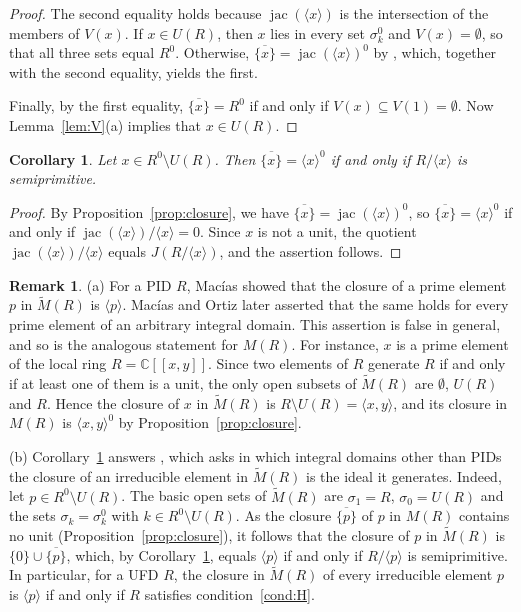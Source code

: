 \documentclass[12pt,reqno,a4paper]{amsart}
\newcommand{\C}{\mathbb{C}}
\newcommand{\clo}[1]{\overline{\{#1\}}}
\newcommand{\pow}[1]{[\![#1]\!]}
\DeclareMathOperator{\jac}{jac}
\theoremstyle{plain}
\newtheorem{corollary}[theorem]{Corollary}
\theoremstyle{definition}
\newtheorem{remark}[theorem]{Remark}
\begin{document}
\begin{proof}
The second equality holds because $\jac(\langle x\rangle)$ is the intersection of the members of $V(x)$. If $x\in U(R)$, then $x$ lies in every set $\sigma_k^0$ and $V(x)=\emptyset$, so that all three sets equal $R^0$. Otherwise, $\clo{x}=\jac(\langle x\rangle)^0$ by \cite[Proposition~3.8]{MaciasOrtiz}, which, together with the second equality, yields the first.

Finally, by the first equality, $\clo{x}=R^0$ if and only if $V(x)\subseteq V(1)=\emptyset$. Now Lemma~\ref{lem:V}(a) implies that $x\in U(R)$.
\end{proof}
\begin{corollary}\label{cor:closureprime}
Let $x\in R^0\setminus U(R)$. Then $\clo{x}=\langle x\rangle^0$ if and only if $R/\langle x\rangle$ is semiprimitive.
\end{corollary}
\begin{proof}
By Proposition~\ref{prop:closure}, we have $\clo{x}=\jac(\langle x\rangle)^0$, so $\clo{x}=\langle x\rangle^0$ if and only if $\jac(\langle x\rangle)/\langle x\rangle=0$. Since $x$ is not a unit, the quotient $\jac(\langle x\rangle)/\langle x\rangle$ equals $J(R/\langle x\rangle)$, and the assertion follows.
\end{proof}
\begin{remark}\label{rem:MO}
(a) For a PID $R$, Mac\'ias \cite[Theorem~3.1]{MaciasDomains} showed that the closure of a prime element $p$ in $\widetilde{M}(R)$ is $\langle p\rangle$. Mac\'ias and Ortiz \cite[Corollary~3.11]{MaciasOrtiz} later asserted that the same holds for every prime element of an arbitrary integral domain. This assertion is false in general, and so is the analogous statement for $M(R)$. For instance, $x$ is a prime element of the local ring $R=\C\pow{x,y}$. Since two elements of $R$ generate $R$ if and only if at least one of them is a unit, the only open subsets of $\widetilde{M}(R)$ are $\emptyset$, $U(R)$ and $R$. Hence the closure of $x$ in $\widetilde{M}(R)$ is $R\setminus U(R)=\langle x,y\rangle$, and its closure in $M(R)$ is $\langle x,y\rangle^0$ by Proposition~\ref{prop:closure}.

(b) Corollary~\ref{cor:closureprime} answers \cite[Problem~3.18]{MaciasOrtiz}, which asks in which integral domains other than PIDs the closure of an irreducible element in $\widetilde{M}(R)$ is the ideal it generates. Indeed, let $p\in R^0\setminus U(R)$. The basic open sets of $\widetilde{M}(R)$ are $\sigma_1=R$, $\sigma_0=U(R)$ and the sets $\sigma_k=\sigma_k^0$ with $k\in R^0\setminus U(R)$. As the closure $\clo{p}$ of $p$ in $M(R)$ contains no unit (Proposition~\ref{prop:closure}), it follows that the closure of $p$ in $\widetilde{M}(R)$ is $\{0\}\cup\clo{p}$, which, by Corollary~\ref{cor:closureprime}, equals $\langle p\rangle$ if and only if $R/\langle p\rangle$ is semiprimitive. In particular, for a UFD $R$, the closure in $\widetilde{M}(R)$ of every irreducible element $p$ is $\langle p\rangle$ if and only if $R$ satisfies condition~\ref{cond:H}.
\end{remark}
\end{document}
